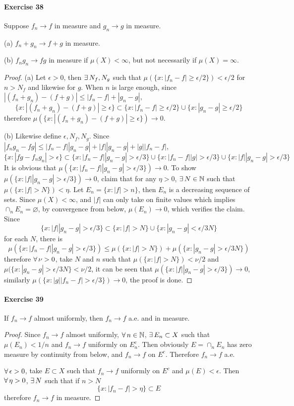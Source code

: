 \paragraph{Exercise 38}
Suppose $f_n\to f$ in measure and $g_n\to g$ in measure.
\par (a) $f_n+g_n\to f+g$ in measure.
\par (b) $f_ng_n\to fg$ in measure if $\mu(X)<\infty$, but not necessarily if $\mu(X)=\infty$.
\begin{proof}
    \par (a) Let $\epsilon>0$, then $\exists\, N_f, N_g$ such that $\mu(\{x:|f_n-f|\ge\epsilon/2\})<\epsilon/2$ for $n>N_f$ and likewise for $g$. When $n$ is large enough, since $|(f_n+g_n)-(f+g)|\le|f_n-f|+|g_n-g|$,
    $$
    \{x:|(f_n+g_n)-(f+g)|\ge\epsilon\}\subset\{x:|f_n-f|\ge\epsilon/2\}\cup\{x:|g_n-g|\ge\epsilon/2\}
    $$
    therefore $\mu(\{x:|(f_n+g_n)-(f+g)|\ge\epsilon\})\to 0$.
    \par (b) Likewise define $\epsilon, N_f, N_g$. Since $|f_ng_n-fg|\le|f_n-f||g_n-g|+|f||g_n-g|+|g||f_n-f|$,
    $$
    \{x:|fg-f_ng_n|>\epsilon\}\subset\{x:|f_n-f||g_n-g|>\epsilon/3\}\cup\{x:|f_n-f||g|>\epsilon/3\}\cup\{x:|f||g_n-g|>\epsilon/3\}
    $$
    It is obvious that $\mu(\{x:|f_n-f||g_n-g|>\epsilon/3\})\to 0$. To show $\mu(\{x:|f||g_n-g|>\epsilon/3\})\to 0$, claim that for any $\eta>0$, $\exists\, N\in\mathbb{N}$ such that $\mu(\{x:|f|>N\})<\eta$. Let $E_n=\{x:|f|>n\}$, then $E_n$ is a decreasing sequence of sets. Since $\mu(X)<\infty$, and $|f|$ can only take on finite values which implies $\cap_nE_n=\varnothing$, by convergence from below, $\mu(E_n)\to 0$, which verifies the claim. Since
    $$
    \{x:|f||g_n-g|>\epsilon/3\}\subset\{x:|f|>N\}\cup\{x:|g_n-g|<\epsilon/3N\}
    $$
    for each $N$, there is
    $$
    \mu(\{x:|f_n-f||g_n-g|>\epsilon/3\})\le\mu(\{x:|f|>N\})+\mu(\{x:|g_n-g|>\epsilon/3N\})
    $$
    therefore $\forall\,\nu>0$, take $N$ and $n$ such that $\mu(\{x:|f|>N\})<\nu/2$ and $\mu(\{x:|g_n-g|>\epsilon/3N\}<\nu/2$, it can be seen that $\mu(\{x:|f||g_n-g|>\epsilon/3\})\to 0$, similarly $\mu(\{x:|g||f_n-f|>\epsilon/3\})\to 0$, the proof is done.
\end{proof}
\paragraph{Exercise 39}
If $f_n\to f$ almost uniformly, then $f_n\to f$ a.e. and in measure.
\begin{proof}
    Since $f_n\to f$ almost uniformly, $\forall\, n\in\mathbb{N}$, $\exists\, E_n\subset X$ such that $\mu(E_n)<1/n$ and $f_n\to f$ uniformly on $E_n^c$. Then obviously $E=\cap_nE_n$ has zero measure by continuity from below, and $f_n\to f$ on $E^c$. Therefore $f_n\to f$ a.e. 
    \par $\forall\,\epsilon>0$, take $E\subset X$ such that $f_n\to f$ uniformly on $E^c$ and $\mu(E)<\epsilon$. Then $\forall\,\eta>0$, $\exists\, N$ such that if $n>N$
    $$
    \{x:|f_n-f|>\eta\}\subset E
    $$
    therefore $f_n\to f$ in measure.
\end{proof}

